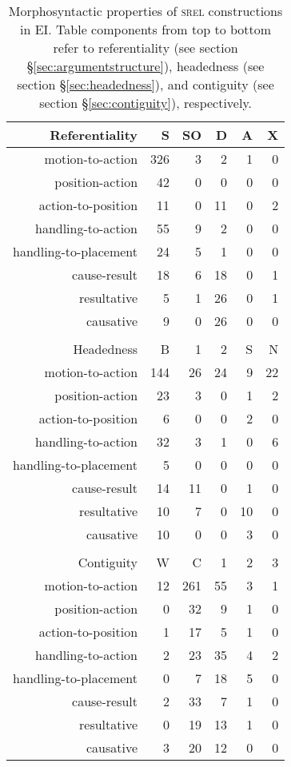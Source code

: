 \begin{table}
\centering

\begin{tabular}{rrrrrr}
  \lsptoprule
Referentiality & S & SO & D & A & X \\ 
  \hline
  motion-to-action & 326 &   3 &   2 &   1 &   0 \\ 
  position-action &  42 &   0 &   0 &   0 &   0 \\ 
  action-to-position &  11 &   0 &  11 &   0 &   2 \\ 
  handling-to-action &  55 &   9 &   2 &   0 &   0 \\ 
  handling-to-placement &  24 &   5 &   1 &   0 &   0 \\ 
  cause-result &  18 &   6 &  18 &   0 &   1 \\ 
  resultative &   5 &   1 &  26 &   0 &   1 \\ 
  causative &   9 &   0 &  26 &   0 &   0 \\ 
   \hline
 \\
  \hline
Headedness & B & 1 & 2 & S & N \\ 
  \hline
  motion-to-action & 144 &  26 &  24 &   9 &  22 \\ 
  position-action &  23 &   3 &   0 &   1 &   2 \\ 
  action-to-position &   6 &   0 &   0 &   2 &   0 \\ 
  handling-to-action &  32 &   3 &   1 &   0 &   6 \\ 
  handling-to-placement &   5 &   0 &   0 &   0 &   0 \\ 
  cause-result &  14 &  11 &   0 &   1 &   0 \\ 
  resultative &  10 &   7 &   0 &  10 &   0 \\ 
  causative &  10 &   0 &   0 &   3 &   0 \\ 
   \hline
 \\
  \hline
Contiguity & W & C & 1 & 2 & 3 \\ 
  \hline
  motion-to-action &  12 & 261 &  55 &   3 &   1 \\ 
  position-action &   0 &  32 &   9 &   1 &   0 \\ 
  action-to-position &   1 &  17 &   5 &   1 &   0 \\ 
  handling-to-action &   2 &  23 &  35 &   4 &   2 \\ 
  handling-to-placement &   0 &   7 &  18 &   5 &   0 \\ 
  cause-result &   2 &  33 &   7 &   1 &   0 \\ 
  resultative &   0 &  19 &  13 &   1 &   0 \\ 
  causative &   3 &  20 &  12 &   0 &   0 \\ 
   \hline
\end{tabular}
\caption[Morphosyntactic properties of \textsc{srel} constructions]{Morphosyntactic properties of \textsc{srel} constructions in EI. Table components from top to bottom refer to referentiality (see section §\ref{sec:argumentstructure}), headedness (see section §\ref{sec:headedness}), and contiguity (see section §\ref{sec:contiguity}), respectively.}
\label{table:SREL_formal}

\end{table}


